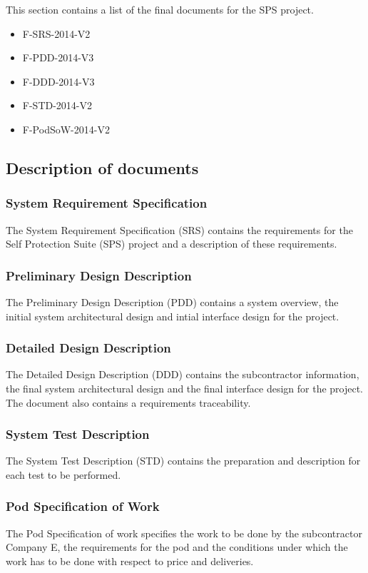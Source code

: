 This section contains a list of the final documents for the SPS project.\\
\begin{itemize}
\item F-SRS-2014-V2
\item F-PDD-2014-V3
\item F-DDD-2014-V3
\item F-STD-2014-V2
\item F-PodSoW-2014-V2\\
\end{itemize}

\subsection{Description of documents}
\subsubsection{System Requirement Specification}
The System Requirement Specification (SRS) contains the requirements for the Self Protection Suite (SPS) project and a description of these requirements.\\
\subsubsection{Preliminary Design Description}
The Preliminary Design Description (PDD) contains a system overview, the initial system architectural design and intial interface design for the project.\\
\subsubsection{Detailed Design Description}
The Detailed Design Description (DDD) contains the subcontractor information, the final system architectural design and the final interface design for the project. The document also contains a requirements traceability.\\
\subsubsection{System Test Description}
The System Test Description (STD) contains  the preparation and description for each test to be performed.\\
\subsubsection{Pod Specification of Work}
The Pod Specification of work specifies the work to be done by the subcontractor Company E, the requirements for the pod and the conditions under which the work has to be done with respect to price and deliveries.

